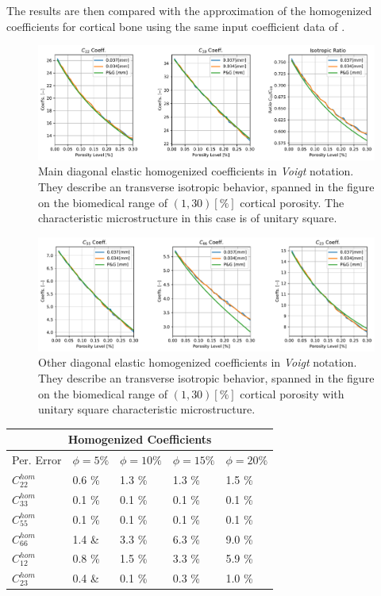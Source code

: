 The results are then compared with the approximation of the homogenized coefficients for cortical bone using the same input coefficient data of \cite{Parnell2008}.

\begin{figure}[!h]
	\centering
	\includegraphics[scale=.5]{images/CellsProb/CellProb_MainHomCoeffsCircular.pdf}
	\caption{Main diagonal elastic homogenized coefficients in \textit{Voigt} notation. They describe an transverse isotropic behavior, spanned in the figure on the biomedical range of $(1,30) [\%]$ cortical porosity. The characteristic microstructure in this case is of unitary square.}
	\label{MainHomCoeffsSquare}
\end{figure}

\begin{figure}[!h]
	\centering
	\includegraphics[scale=.5]{images/CellsProb/CellProb_OthersHomCoeffsCircular.pdf}
	\caption{Other diagonal elastic homogenized coefficients in \textit{Voigt} notation. They describe an transverse isotropic behavior, spanned in the figure on the biomedical range of $(1,30) [\%]$ cortical porosity with unitary square characteristic microstructure.}
	\label{OtherHomCoeffsSquare}
\end{figure}

\begin{center}
\begin{tabular}{ |p{2.5cm}||p{2cm}|p{2cm}|p{2cm}|p{2cm}| }
 \hline
 \multicolumn{5}{|c|}{Homogenized Coefficients} \\
 \hline
 Per. Error & $\phi = 5 \%$ & $\phi = 10 \%$ & $\phi = 15 \%$ & $\phi = 20 \%$ \\
 \hline
 $C^{hom}_{22}$ & 0.6 \% & 1.3 \% & 1.3 \% & 1.5 \% \\
 $C^{hom}_{33}$ & 0.1 \% & 0.1 \% & 0.1 \% & 0.1 \% \\
 $C^{hom}_{55}$ & 0.1 \% & 0.1 \% & 0.1 \% & 0.1 \% \\
 $C^{hom}_{66}$ & 1.4 \& & 3.3 \% & 6.3 \% & 9.0 \% \\
 $C^{hom}_{12}$ & 0.8 \% & 1.5 \% & 3.3 \% & 5.9 \% \\
 $C^{hom}_{23}$ & 0.4 \& & 0.1 \% & 0.3 \% & 1.0 \% \\
 \hline
\end{tabular}
\end{center}

